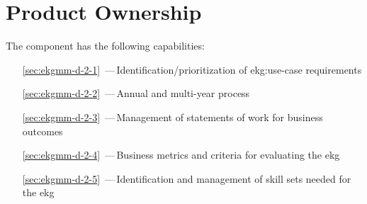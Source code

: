\chapter{Product Ownership}\label{ch:ekg-mm-d-2}

The  component has the following capabilities:

\begin{itemize}[leftmargin=.5in]
  \item [\ref{sec:ekgmm-d-2-1}] \,---\,Identification/prioritization of \gls{ekg:use-case} requirements
  \item [\ref{sec:ekgmm-d-2-2}] \,---\,Annual and multi-year  process
  \item [\ref{sec:ekgmm-d-2-3}] \,---\,Management of statements of work
  for business outcomes
  \item [\ref{sec:ekgmm-d-2-4}] \,---\,Business metrics and criteria for evaluating the \gls{ekg}
  \item [\ref{sec:ekgmm-d-2-5}] \,---\,Identification and management of skill sets
  needed for the \gls{ekg}
\end{itemize}






